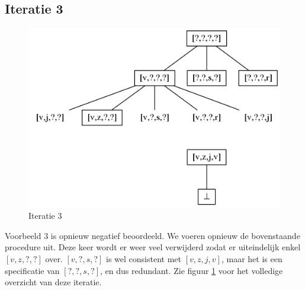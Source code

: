 \documentclass[alternative-exam.tex]{subfiles}
\begin{document}
\subsection{Iteratie 3}
\begin{figure}
[H]
\centering
\caption{Iteratie 3}
\label{iter_3}
\includegraphics[scale=0.5]{resources/graphs/iteration_3.png}
\end{figure}
Voorbeeld $3$ is opnieuw negatief beoordeeld. We voeren opnieuw de bovenstaande procedure uit. Deze keer wordt er weer veel verwijderd zodat er uiteindelijk enkel $[v,z,?,?]$ over. $[v,?,s,?]$ is wel consistent met $[v,z,j,v]$, maar het is een specificatie van $[?,?,s,?]$, en dus redundant. Zie figuur \ref{iter_3} voor het volledige overzicht van deze iteratie.
\end{document}
